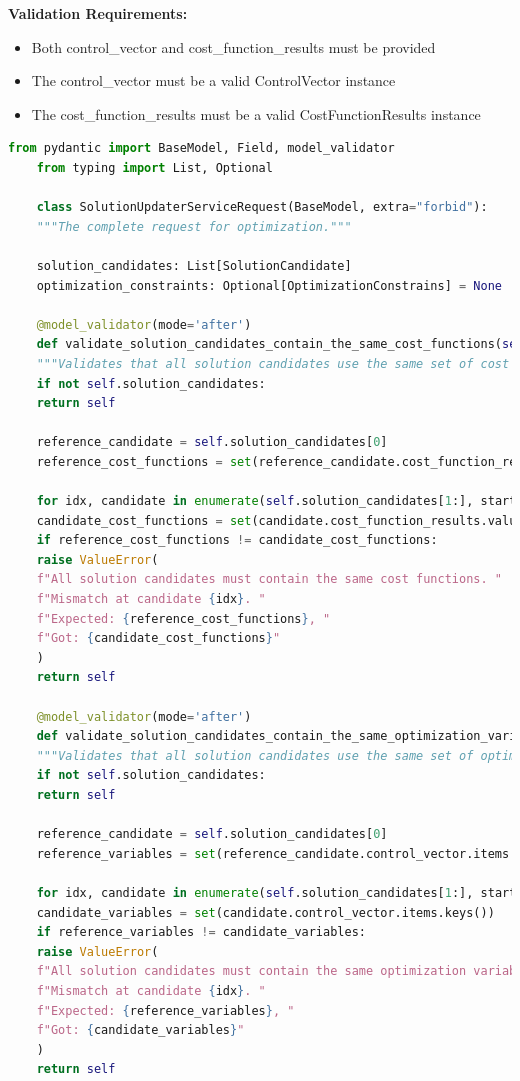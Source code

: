 \textbf{Validation Requirements:}
\begin{itemize}
	\item Both control\_vector and cost\_function\_results must be provided
	\item The control\_vector must be a valid ControlVector instance
	\item The cost\_function\_results must be a valid CostFunctionResults instance
\end{itemize}

\begin{lstlisting}[language=Python, caption={SolutionUpdaterServiceRequest model with complex validation logic}]
	from pydantic import BaseModel, Field, model_validator
	from typing import List, Optional

	class SolutionUpdaterServiceRequest(BaseModel, extra="forbid"):
	"""The complete request for optimization."""

	solution_candidates: List[SolutionCandidate]
	optimization_constraints: Optional[OptimizationConstrains] = None

	@model_validator(mode='after')
	def validate_solution_candidates_contain_the_same_cost_functions(self) -> 'SolutionUpdaterServiceRequest':
	"""Validates that all solution candidates use the same set of cost functions."""
	if not self.solution_candidates:
	return self

	reference_candidate = self.solution_candidates[0]
	reference_cost_functions = set(reference_candidate.cost_function_results.values.keys())

	for idx, candidate in enumerate(self.solution_candidates[1:], start=1):
	candidate_cost_functions = set(candidate.cost_function_results.values.keys())
	if reference_cost_functions != candidate_cost_functions:
	raise ValueError(
	f"All solution candidates must contain the same cost functions. "
	f"Mismatch at candidate {idx}. "
	f"Expected: {reference_cost_functions}, "
	f"Got: {candidate_cost_functions}"
	)
	return self

	@model_validator(mode='after')
	def validate_solution_candidates_contain_the_same_optimization_variables(self) -> 'SolutionUpdaterServiceRequest':
	"""Validates that all solution candidates use the same set of optimization variables."""
	if not self.solution_candidates:
	return self

	reference_candidate = self.solution_candidates[0]
	reference_variables = set(reference_candidate.control_vector.items.keys())

	for idx, candidate in enumerate(self.solution_candidates[1:], start=1):
	candidate_variables = set(candidate.control_vector.items.keys())
	if reference_variables != candidate_variables:
	raise ValueError(
	f"All solution candidates must contain the same optimization variables. "
	f"Mismatch at candidate {idx}. "
	f"Expected: {reference_variables}, "
	f"Got: {candidate_variables}"
	)
	return self


\end{lstlisting}
